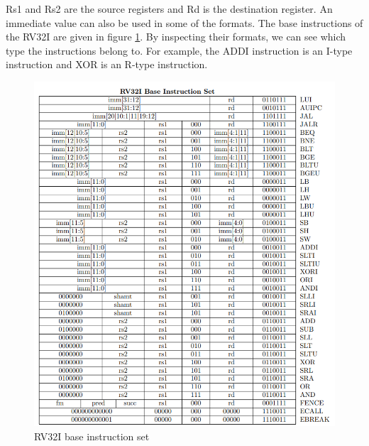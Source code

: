 Rs1 and Rs2 are the source registers and Rd is the destination register. An immediate value can also be used in some of the formats. 
The base instructions of the RV32I are given in figure \ref{fig:rv32i_base_instruction_set}. By inspecting their formats, we can see which type the instructions belong to. For example, the ADDI instruction is an I-type instruction and XOR is an R-type instruction.

\begin{figure}
    \centering
    \includegraphics{riscv/rv32i_base_instruction_set.png}
    \caption{RV32I base instruction set \cite{rvmanual}}
    \label{fig:rv32i_base_instruction_set}
\end{figure}

